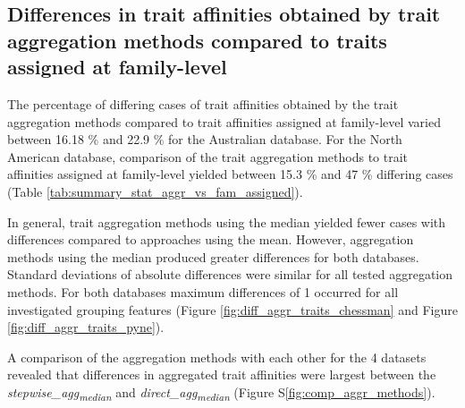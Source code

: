 \documentclass[../Draft_harmonization_paper.tex]{subfiles}
\begin{document}

\subsection*{Differences in trait affinities obtained by trait aggregation methods compared to traits assigned at family-level}
\label{sec:diff_trait_agg_chessman}

The percentage of differing cases of trait affinities obtained by the trait aggregation methods compared to trait affinities assigned at family-level varied between 16.18 \% and 22.9 \% for the Australian database. For the North American database, comparison of the trait aggregation methods to trait affinities assigned at family-level yielded between 15.3 \% and 47 \% differing cases (Table \ref{tab:summary_stat_aggr_vs_fam_assigned}).

In general, trait aggregation methods using the median yielded fewer cases with differences compared to approaches using the mean. However, aggregation methods using the median produced greater differences for both databases. Standard deviations of absolute differences were similar for all tested aggregation methods. For both databases maximum differences of 1 occurred for all investigated grouping features (Figure \ref{fig:diff_aggr_traits_chessman} and Figure \ref{fig:diff_aggr_traits_pyne}).

A comparison of the aggregation methods with each other for the 4 datasets revealed that differences in aggregated trait affinities were largest between the \textit{stepwise\_agg\textsubscript{median}} and \textit{direct\_agg\textsubscript{median}} (Figure S\ref{fig:comp_aggr_methods}).
\end{document}
